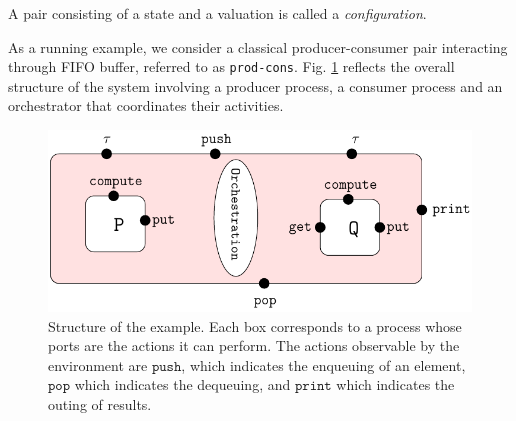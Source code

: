 \documentclass[runningheads]{llncs}
\begin{document}
A pair consisting of a state and a valuation is called a \emph{configuration}.
%


\newpage
\begin{example} As a running example, we consider a classical producer-consumer pair  interacting through FIFO buffer,  referred to as \texttt{prod-cons}.  Fig. \ref{Fig:Architect} reflects the overall structure of the system involving a producer process, a consumer process and an orchestrator that coordinates  their activities. 

\begin{figure}[h]
 \centering
   \includegraphics[width=.70\textwidth]{Figures/Architecture.pdf}
   \caption{Structure of the example. Each box corresponds to a process whose ports are the actions it can perform. The  actions observable by the environment are $\texttt{push}$, which indicates the enqueuing of an element, $\texttt{pop}$ which indicates the dequeuing, and $\texttt{print}$ which indicates the outing of results. \label{Fig:Architect}} 
\end{figure}



\end{example}
\end{document}
